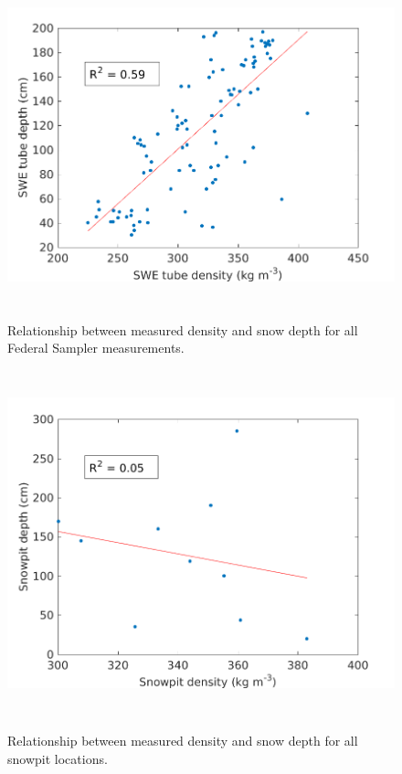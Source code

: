 \documentclass[12pt]{article}
\begin{document}
\begin{figure}[p]
	\centering
	\includegraphics[height = 10cm]{DepthDensity_SWEtube.png}\\
	\caption{Relationship between measured density and snow depth for all Federal Sampler measurements.}
	\label{fig:tube_depth}

	\includegraphics[height = 10cm]{DepthDensity_SP.png}\\
	\caption{Relationship between measured density and snow depth for all snowpit locations.}
	\label{fig:pit_depth}
\end{figure}
\end{document}
